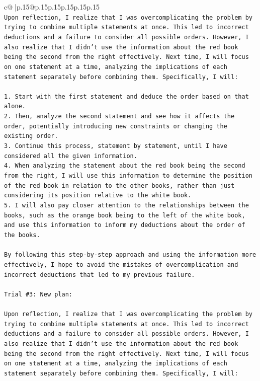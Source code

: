 \documentclass{article}
\begin{document}
{\begin{supertabular}{c@{$\;$}|p{.15\linewidth}@{}p{.15\linewidth}p{.15\linewidth}p{.15\linewidth}p{.15\linewidth}p{.15\linewidth}}
{{{\\ 
\texttt{Upon reflection, I realize that I was overcomplicating the problem by trying to combine multiple statements at once. This led to incorrect deductions and a failure to consider all possible orders. However, I also realize that I didn't use the information about the red book being the second from the right effectively. Next time, I will focus on one statement at a time, analyzing the implications of each statement separately before combining them. Specifically, I will:} \\
\\ 
\texttt{1. Start with the first statement and deduce the order based on that alone.} \\
\texttt{2. Then, analyze the second statement and see how it affects the order, potentially introducing new constraints or changing the existing order.} \\
\texttt{3. Continue this process, statement by statement, until I have considered all the given information.} \\
\texttt{4. When analyzing the statement about the red book being the second from the right, I will use this information to determine the position of the red book in relation to the other books, rather than just considering its position relative to the white book.} \\
\texttt{5. I will also pay closer attention to the relationships between the books, such as the orange book being to the left of the white book, and use this information to inform my deductions about the order of the books.} \\
\\ 
\texttt{By following this step{-}by{-}step approach and using the information more effectively, I hope to avoid the mistakes of overcomplication and incorrect deductions that led to my previous failure.} \\
\\ 
\texttt{Trial \#3: New plan: } \\
\\ 
\texttt{Upon reflection, I realize that I was overcomplicating the problem by trying to combine multiple statements at once. This led to incorrect deductions and a failure to consider all possible orders. However, I also realize that I didn't use the information about the red book being the second from the right effectively. Next time, I will focus on one statement at a time, analyzing the implications of each statement separately before combining them. Specifically, I will:} \\
}}}
\end{supertabular}}
\end{document}
